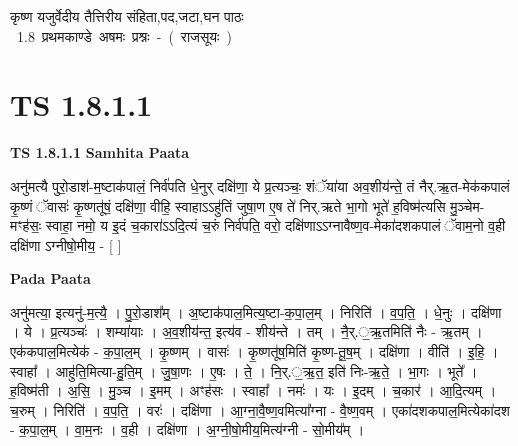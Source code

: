 \documentclass[17pt]{extarticle}
\begin{document}
\begin{titlepage}
    \begin{center}
 
\begin{sanskrit}
    { \Large
    कृष्ण यजुर्वेदीय तैत्तिरीय संहिता,पद,जटा,घन पाठः 
    }
    \\
    \vspace{2.5cm}
    \mbox{ \Large
    1.8     प्रथमकाण्डे अषमः प्रश्नः - ( राजसूयः )   }
\end{sanskrit}
\end{center}

\end{titlepage}
\tableofcontents
{}
\pagebreak


\section{ TS 1.8.1.1 }

\textbf{TS 1.8.1.1 } \newline
\textbf{Samhita Paata} \newline

अनु॑मत्यै पुरो॒डाश॑-म॒ष्टाक॑पालं॒ निर्व॑पति धे॒नुर् दक्षि॑णा॒ ये प्र॒त्यञ्चः॒ शंॅया॑या अव॒शीय॑न्ते॒ तं नैर्.ऋ॒त-मेक॑कपालं कृ॒ष्णं ॅवासः॑ कृ॒ष्णतू॑षं॒ दक्षि॑णा॒ वीहि॒ स्वाहाऽऽहु॑तिं जुषा॒ण ए॒ष ते॑ निर्.ऋते भा॒गो भूते॑ ह॒विष्म॑त्यसि मु॒ञ्चेम-मꣳह॑सः॒ स्वाहा॒ नमो॒ य इ॒दं च॒कारा॑ऽऽदि॒त्यं च॒रुं निर्व॑पति॒ वरो॒ दक्षि॑णाऽऽग्नावैष्ण॒व-मेका॑दशकपालं ॅवाम॒नो व॒ही दक्षि॑णा ऽग्नीषो॒मीय॒ - [ ] \newline

\textbf{Pada Paata} \newline

अनु॑मत्या॒ इत्यनु॑-म॒त्यै॒ । पु॒रो॒डाश᳚म् । अ॒ष्टाक॑पाल॒मित्य॒ष्टा-क॒पा॒ल॒म् । निरिति॑ । व॒प॒ति॒ । धे॒नुः । दक्षि॑णा । ये । प्र॒त्यञ्चः॑ । शम्या॑याः । अ॒व॒शीय॑न्त॒ इत्य॑व - शीय॑न्ते । तम् । नै॒र्.॒ऋ॒तमिति॑ नैः - ऋ॒तम् । एक॑कपाल॒मित्येक॑ - क॒पा॒ल॒म् । कृ॒ष्णम् । वासः॑ । कृ॒ष्णतू॑ष॒मिति॑ कृ॒ष्ण-तू॒ष॒म् । दक्षि॑णा । वीति॑ । इ॒हि॒ । स्वाहा᳚ । आहु॑ति॒मित्या-हु॒ति॒म् । जु॒षा॒णः । ए॒षः । ते॒ । नि॒र्.॒ऋ॒त॒ इति॑ निः-ऋ॒ते॒ । भा॒गः । भूते᳚ । ह॒विष्म॑ती । अ॒सि॒ । मु॒ञ्च । इ॒मम् । अꣳह॑सः । स्वाहा᳚ । नमः॑ । यः । इ॒दम् । च॒कार॑ । आ॒दि॒त्यम् । च॒रुम् । निरिति॑ । व॒प॒ति॒ । वरः॑ । दक्षि॑णा । आ॒ग्ना॒वै॒ष्ण॒वमित्या᳚ग्ना - वै॒ष्ण॒वम् । एका॑दशकपाल॒मित्येका॑दश - क॒पा॒ल॒म् । वा॒म॒नः । व॒ही । दक्षि॑णा । अ॒ग्नी॒षो॒मीय॒मित्य॑ग्नी - सो॒मीय᳚म् ।  \newline
\end{document}

